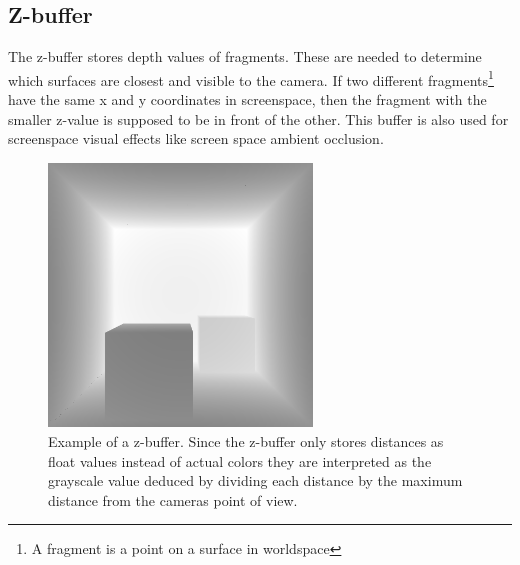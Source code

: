 \documentclass{ACGSeminar}
\begin{document}
	\subsection{Z-buffer}
		The z-buffer stores depth values of fragments. These are needed to determine which surfaces are closest and visible to the camera. If two different fragments\footnote{A fragment is a point on a surface in worldspace\footnotemark} have the same x and y coordinates in screenspace\footnotemark, then the fragment with the smaller z-value is supposed to be in front of the other. This buffer is also used for screenspace visual effects like screen space ambient occlusion. 
		\addtocounter{footnote}{-1}
		\begin{figure}[htb!]%
			\begin{center}%
				\includegraphics[width=7cm]{img/z_buffer.png}
			\end{center}%
			\caption{Example of a z-buffer. Since the z-buffer only stores distances as float values instead of actual colors they are interpreted as the grayscale value deduced by dividing each
			distance by the maximum distance from the cameras point of view.}%
			\label{fig:z_buffer}%
		\end{figure}%
\end{document}
